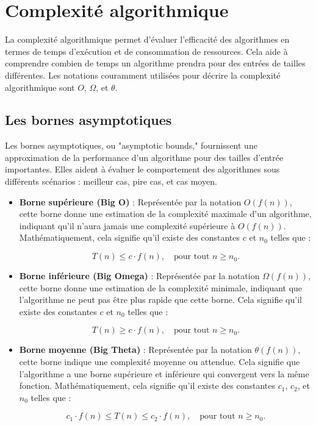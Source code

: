 \chapter{Complexité algorithmique}

La complexité algorithmique permet d'évaluer l'efficacité des algorithmes en termes de temps d'exécution et de consommation de ressources. Cela aide à comprendre combien de temps un algorithme prendra pour des entrées de tailles différentes. Les notations couramment utilisées pour décrire la complexité algorithmique sont $O$, $\Omega$, et $\theta$.

\section{Les bornes asymptotiques}

Les bornes asymptotiques, ou "asymptotic bounds," fournissent une approximation de la performance d'un algorithme pour des tailles d'entrée importantes. Elles aident à évaluer le comportement des algorithmes sous différents scénarios : meilleur cas, pire cas, et cas moyen.

\begin{itemize}
	\item \textbf{Borne supérieure (Big O)} : Représentée par la notation \(O(f(n))\), cette borne donne une estimation de la complexité maximale d'un algorithme, indiquant qu'il n'aura jamais une complexité supérieure à \(O(f(n))\). Mathématiquement, cela signifie qu'il existe des constantes \(c\) et \(n_0\) telles que :
	
	\[ T(n) \leq c \cdot f(n), \quad \text{pour tout } n \geq n_0. \]
	
	\item \textbf{Borne inférieure (Big Omega)} : Représentée par la notation \(\Omega(f(n))\), cette borne donne une estimation de la complexité minimale, indiquant que l'algorithme ne peut pas être plus rapide que cette borne. Cela signifie qu'il existe des constantes \(c\) et \(n_0\) telles que :
	
	\[ T(n) \geq c \cdot f(n), \quad \text{pour tout } n \geq n_0. \]
	
	\item \textbf{Borne moyenne (Big Theta)} : Représentée par la notation \(\theta(f(n))\), cette borne indique une complexité moyenne ou attendue. Cela signifie que l'algorithme a une borne supérieure et inférieure qui convergent vers la même fonction. Mathématiquement, cela signifie qu'il existe des constantes \(c_1\), \(c_2\), et \(n_0\) telles que :
	
	\[ c_1 \cdot f(n) \leq T(n) \leq c_2 \cdot f(n), \quad \text{pour tout } n \geq n_0. \]
\end{itemize}

